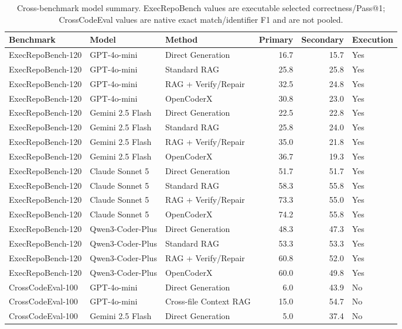 \begin{table}[t]
\centering
\scriptsize
\caption{Cross-benchmark model summary. ExecRepoBench values are executable selected correctness/Pass@1; CrossCodeEval values are native exact match/identifier F1 and are not pooled.}
\label{tab:cross_benchmark_final}
\begin{tabular}{lllrrl}
\toprule
Benchmark & Model & Method & Primary & Secondary & Execution \\
\midrule
ExecRepoBench-120 & GPT-4o-mini & Direct Generation & 16.7 & 15.7 & Yes \\
ExecRepoBench-120 & GPT-4o-mini & Standard RAG & 25.8 & 25.8 & Yes \\
ExecRepoBench-120 & GPT-4o-mini & RAG + Verify/Repair & 32.5 & 24.8 & Yes \\
ExecRepoBench-120 & GPT-4o-mini & OpenCoderX & 30.8 & 23.0 & Yes \\
ExecRepoBench-120 & Gemini 2.5 Flash & Direct Generation & 22.5 & 22.8 & Yes \\
ExecRepoBench-120 & Gemini 2.5 Flash & Standard RAG & 25.8 & 24.0 & Yes \\
ExecRepoBench-120 & Gemini 2.5 Flash & RAG + Verify/Repair & 35.0 & 21.8 & Yes \\
ExecRepoBench-120 & Gemini 2.5 Flash & OpenCoderX & 36.7 & 19.3 & Yes \\
ExecRepoBench-120 & Claude Sonnet 5 & Direct Generation & 51.7 & 51.7 & Yes \\
ExecRepoBench-120 & Claude Sonnet 5 & Standard RAG & 58.3 & 55.8 & Yes \\
ExecRepoBench-120 & Claude Sonnet 5 & RAG + Verify/Repair & 73.3 & 55.0 & Yes \\
ExecRepoBench-120 & Claude Sonnet 5 & OpenCoderX & 74.2 & 55.8 & Yes \\
ExecRepoBench-120 & Qwen3-Coder-Plus & Direct Generation & 48.3 & 47.3 & Yes \\
ExecRepoBench-120 & Qwen3-Coder-Plus & Standard RAG & 53.3 & 53.3 & Yes \\
ExecRepoBench-120 & Qwen3-Coder-Plus & RAG + Verify/Repair & 60.8 & 52.0 & Yes \\
ExecRepoBench-120 & Qwen3-Coder-Plus & OpenCoderX & 60.0 & 49.8 & Yes \\
CrossCodeEval-100 & GPT-4o-mini & Direct Generation & 6.0 & 43.9 & No \\
CrossCodeEval-100 & GPT-4o-mini & Cross-file Context RAG & 15.0 & 54.7 & No \\
CrossCodeEval-100 & Gemini 2.5 Flash & Direct Generation & 5.0 & 37.4 & No \\

\end{tabular}
\end{table}
